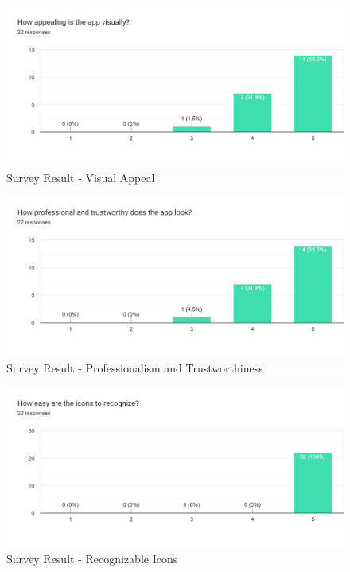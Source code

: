 \documentclass[12pt, titlepage]{article}
\begin{document}
\begin{figure}[!h]
    \centering
    \includegraphics[width=\textwidth]{visual_appeal.jpg}
    \caption{Survey Result - Visual Appeal}
    \label{fig:visual_appeal}
\end{figure}
\begin{figure}[!h]
    \centering
    \includegraphics[width=\textwidth]{professionalism.jpg}
    \caption{Survey Result - Professionalism and Trustworthiness}
    \label{fig:professionalism}
\end{figure}
\begin{figure}[!h]
    \centering
    \includegraphics[width=\textwidth]{recognize_icons.jpg}
    \caption{Survey Result - Recognizable Icons}
    \label{fig:recognize_icons}
\end{figure}
\end{document}
